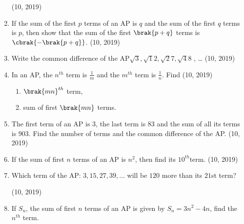 \begin{enumerate}[label=\thesubsection.\arabic*,ref=\thesubsection.\theenumi,itemsep=1pt]
\hfill (10, 2019) \item If the sum of the first $p$ terms of an AP is $q$ and the sum of the first $q$ terms is $p$, then show that the sum of the first $\brak{p + q}$ terms is $\cbrak {-\brak {p + q}}$.
%
\hfill (10, 2019) \item Write the common difference of the AP${\sqrt3} , {\sqrt12} , {\sqrt27} , {\sqrt48}$ ,  \dots  
%
\hfill (10, 2019) \item In an AP, the $n^{th}$ term is ${\frac{1}{m}}$ and the $m^{th}$ term is $\frac{1}{n}$. Find 
\hfill (10, 2019)
\begin{enumerate}
      \item  $\brak{mn}^{th}$ term,
      \item sum of first $\brak{mn}$ terms.
\end{enumerate}
%
 \item The first term of an AP is 3, the last term is 83 and the sum of all its terms is 903. Find the number of terms and the common difference of the AP.
 \hfill (10, 2019) \item If the sum of first $n$ terms of an  AP  is $n^2$, then find its $10^{th} $term.
\hfill (10, 2019) \item Which term of the AP: $3, 15, 27, 39, \dots$ will be $120$ more than its $21$st term?

\hfill (10, 2019) \item If $S_n$, the sum of first $n$ terms of an  AP  is given by $S_n=3n^2-4n$, find the $n^{th}$ term.


\end{enumerate}
